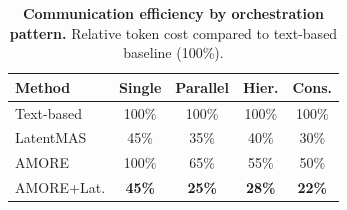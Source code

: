 
\begin{table}[t]
	\caption{\textbf{Communication efficiency by orchestration pattern.}
		Relative token cost compared to text-based baseline (100\%).}
	\label{tab:pattern_efficiency}
	\centering
	\small
	\setlength{\tabcolsep}{2.4pt}
	\begin{tabular}{lcccc}
		\toprule
		\textbf{Method} & \textbf{Single} & \textbf{Parallel} & \textbf{Hier.} & \textbf{Cons.} \\
		\midrule
		Text-based & 100\% & 100\% & 100\% & 100\% \\
		LatentMAS & 45\% & 35\% & 40\% & 30\% \\
		AMORE & 100\% & 65\% & 55\% & 50\% \\
		AMORE+Lat. & \textbf{45\%} & \textbf{25\%} & \textbf{28\%} & \textbf{22\%} \\
		\bottomrule
	\end{tabular}
\end{table}